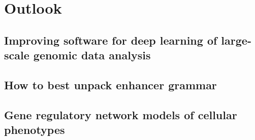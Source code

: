 \chapter{Outlook}
\label{chap:Outlook}

\section{Improving software for deep learning of large-scale genomic data analysis}
\section{How to best unpack enhancer grammar}
\section{Gene regulatory network models of cellular phenotypes}
